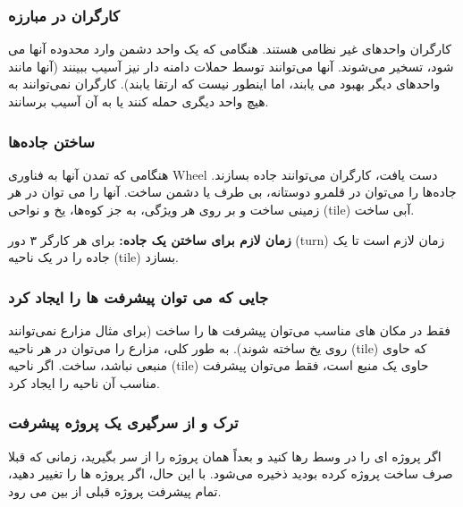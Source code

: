 \documentclass[]{article}
\begin{document}
\subsubsection*{{\titr کارگران در مبارزه}}
کارگران واحدهای غیر نظامی هستند. هنگامی که یک واحد دشمن وارد محدوده آنها می شود، تسخیر می‌شوند.
آنها می‌توانند توسط حملات دامنه دار نیز آسیب ببینند (آنها مانند واحدهای دیگر بهبود می یابند، اما اینطور نیست که ارتقا یابند). کارگران نمی‌توانند به هیچ واحد دیگری حمله کنند یا به آن آسیب برسانند. 

\subsubsection*{{\titr ساختن جاده‌ها}}
هنگامی که تمدن آنها به فناوری Wheel دست یافت، کارگران می‌توانند جاده بسازند.
جاده‌ها را می‌توان در قلمرو دوستانه، بی طرف یا دشمن ساخت. آنها را می توان در هر زمینی ساخت و بر روی هر ویژگی، به جز کوه‌ها، یخ و نواحی (tile) آبی ساخت.

\noindent \textbf{زمان لازم برای ساختن یک جاده:} 
برای  هر کارگر ۳ دور (turn) زمان لازم است تا یک جاده را در یک ناحیه (tile) بسازد.

\subsubsection*{{\titr جایی که می توان پیشرفت ها را ایجاد کرد}}
فقط در مکان های مناسب می‌توان پیشرفت ها را ساخت (برای مثال مزارع نمی‌توانند روی یخ ساخته شوند).
به طور کلی، مزارع را می‌توان در هر ناحیه (tile) که حاوی منبعی نباشد، ساخت. اگر ناحیه (tile) حاوی یک منبع است، فقط می‌توان پیشرفت مناسب آن ناحیه را ایجاد کرد.

\subsubsection*{{\titr ترک و از سرگیری یک پروژه پیشرفت}}
اگر پروژه ای را در وسط رها کنید و بعداً همان پروژه را از سر بگیرید، زمانی که قبلا صرف ساخت پروژه کرده بودید ذخیره می‌شود. با این حال، اگر پروژه ها را تغییر دهید، تمام پیشرفت پروژه قبلی از بین می رود.
\end{document}

